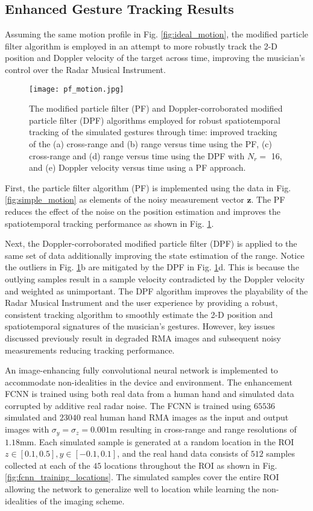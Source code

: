 \documentclass[10pt,journal,final]{IEEEtran}
\begin{document}
\subsection{Enhanced Gesture Tracking Results}
\label{subsec:enhanced_gesture_tracking_results}
Assuming the same motion profile in Fig. \ref{fig:ideal_motion}, the modified particle filter algorithm is employed in an attempt to more robustly track the 2-D position and Doppler velocity of the target across time, improving the musician's control over the Radar Musical Instrument. 

\begin{figure}[h]
	\centering
	\texttt{[image: pf\_motion.jpg]}
	\caption{The modified particle filter (PF) and Doppler-corroborated modified particle filter (DPF) algorithms employed for robust spatiotemporal tracking of the simulated gestures through time: improved tracking of the (a) cross-range and (b) range versus time using the PF, (c) cross-range and (d) range versus time using the DPF with $N_r =$ 16, and (e) Doppler velocity versus time using a PF approach.}
	\label{fig:pf_motion}
\end{figure}

First, the particle filter algorithm (PF) is implemented using the data in Fig. \ref{fig:simple_motion} as elements of the noisy measurement vector $\bm{z}$. The PF reduces the effect of the noise on the position estimation and improves the spatiotemporal tracking performance as shown in Fig. \ref{fig:pf_motion}.

Next, the Doppler-corroborated modified particle filter (DPF) is applied to the same set of data additionally improving the state estimation of the range. Notice the outliers in Fig. \ref{fig:pf_motion}b are mitigated by the DPF in Fig. \ref{fig:pf_motion}d. This is because the outlying samples result in a sample velocity contradicted by the Doppler velocity and weighted as unimportant. The DPF algorithm improves the playability of the Radar Musical Instrument and the user experience by providing a robust, consistent tracking algorithm to smoothly estimate the 2-D position and spatiotemporal signatures of the musician's gestures. However, key issues discussed previously result in degraded RMA images and subsequent noisy measurements reducing tracking performance.

An image-enhancing fully convolutional neural network is implemented to accommodate non-idealities in the device and environment. The enhancement FCNN is trained using both real data from a human hand and simulated data corrupted by additive real radar noise. The FCNN is trained using $65536$ simulated and $23040$ real human hand RMA images as the input and output images with $\sigma_y = \sigma_z = 0.001$m resulting in cross-range and range resolutions of $1.18$mm. Each simulated sample is generated at a random location in the ROI $z \in [0.1,0.5], y \in [-0.1,0.1]$, and the real hand data consists of $512$ samples collected at each of the $45$ locations throughout the ROI as shown in Fig. \ref{fig:fcnn_training_locations}. The simulated samples cover the entire ROI allowing the network to generalize well to location while learning the non-idealities of the imaging scheme.
\end{document}
